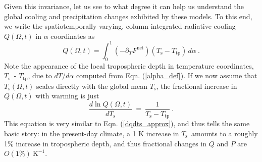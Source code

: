 \documentclass[10pt]{article}
\newcommand{\beqn}{\begin{equation}}
\newcommand{\eeqn}{\end{equation}}
\newcommand{\eqnref}[1]{(\ref{#1})}
\newcommand{\ppt}{\ensuremath{\partial_T}}
\newcommand{\FLW}{\ensuremath{F^\mathrm{LW}}}
\newcommand{\FLWgl}{\ensuremath{F^\mathrm{LW}_{\mathrm{gl}}}}
\newcommand{\FSWgl}{\ensuremath{F^\mathrm{SW}_{\mathrm{gl}}}}
\newcommand{\Fnet}{\ensuremath{F^\mathrm{net}}}
\newcommand{\Fnetgl}{\ensuremath{F^\mathrm{net}_{\mathrm{gl}}}}
\newcommand{\Fgl}{\ensuremath{F_{\mathrm{gl}}}}
\newcommand{\Ts}{\ensuremath{T_\mathrm{s}}}
\newcommand{\Tsgl}{\ensuremath{T_\mathrm{s,gl}}}
\newcommand{\Ttp}{\ensuremath{T_\mathrm{tp}}}
\newcommand{\Kinverse}{\ensuremath{\mathrm{K^{-1}}}}
\begin{document}



Given this invariance, let us see to what degree it can help us understand the global cooling and precipitation changes exhibited by these models. To this end, we write the spatiotemporally varying, column-integrated radiative cooling $Q(\Omega,t)$ in $\alpha$ coordinates as 
	\beqn
		Q(\Omega,t)   =  \int_0^{1} (- \partial_{T} \Fnet) (\Ts - \Ttp)\, d\alpha  \ .
		\label{Q_alpha}
	\eeqn
Note the appearance of the local tropospheric depth in temperature coordinates, \Ts\ - \Ttp,  due to $dT/d\alpha$ computed from Eqn. \eqnref{alpha_def}. If we now assume that $\Ts(\Omega,t)$ scales directly with the global mean \Ts, the fractional increase in $Q(\Omega,t)$ with  warming is just 
\beqn
		\frac{d \ln Q(\Omega,t)}{d \Ts}  \ =\   \frac{1}{\Ts-\Ttp}\ . 
		\label{dqdts_gcm}
\eeqn
This equation is very similar to Eqn. \eqnref{dqdts_approx}, and thus  tells the  same basic story: in the present-day climate, a 1 K increase in \Ts\ amounts to a roughly 1\% increase in tropospheric depth,  and thus fractional changes in  $Q$ and $P$ are $O(1\%)\ \Kinverse$. 
\end{document}
